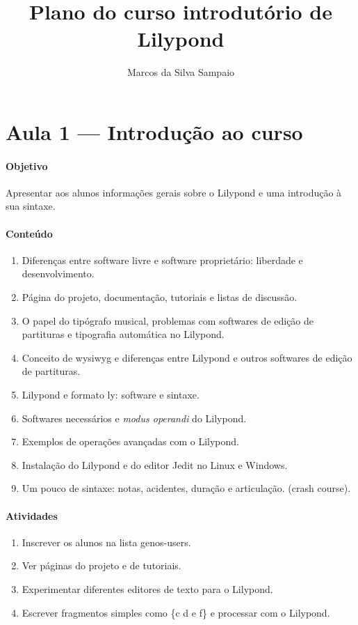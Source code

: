 \documentclass[12pt,brazil]{article}
\newcommand{\eng}[1]{\textit{#1}}
\begin{document}
\title{Plano do curso introdutório de Lilypond}
\author{Marcos da Silva Sampaio}
\maketitle
\thispagestyle{empty}

\section{Aula 1 --- Introdução ao curso}

\paragraph{Objetivo}
Apresentar aos alunos informações gerais sobre o Lilypond e uma
introdução à sua sintaxe.

\paragraph{Conteúdo}
\begin{enumerate}
\item Diferenças entre software livre e software proprietário:
  liberdade e desenvolvimento.
\item Página do projeto, documentação, tutoriais e listas de discussão.
\item O papel do tipógrafo musical, problemas com softwares de edição
  de partituras e tipografia automática no Lilypond.
\item Conceito de wysiwyg e diferenças entre Lilypond e outros
  softwares de edição de partituras.
\item Lilypond e formato ly: software e sintaxe.
\item Softwares necessários e \eng{modus operandi} do Lilypond.
\item Exemplos de operações avançadas com o Lilypond.
\item Instalação do Lilypond e do editor Jedit no Linux e Windows.
\item Um pouco de sintaxe: notas, acidentes, duração e
  articulação. (crash course).
\end{enumerate}

\paragraph{Atividades}
\begin{enumerate}
\item Inscrever os alunos na lista genos-users.
\item Ver páginas do projeto e de tutoriais.
\item Experimentar diferentes editores de texto para o Lilypond.
\item Escrever fragmentos simples como \{c d e f\} e processar com o
  Lilypond.
\end{enumerate}
\end{document}
